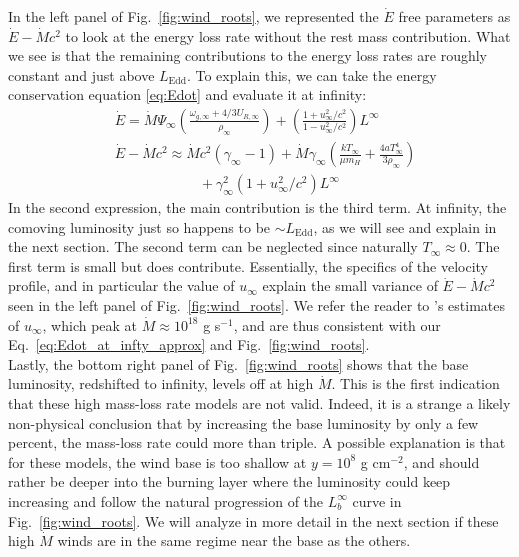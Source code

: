 \documentclass[../main.tex]{subfiles}
\newcommand{\Ledd}{L_\text{Edd}}
\newcommand{\Mdot}{\dot{M}}
\newcommand{\Edot}{\dot{E}}
\begin{document}
In the left panel of Fig.~\ref{fig:wind_roots}, we represented the $\Edot$ free parameters as $\Edot-\Mdot c^2$ to look at the energy loss rate without the rest mass contribution. What we see is that the remaining contributions to the energy loss rates are roughly constant and just above $\Ledd$. To explain this, we can take the energy conservation equation \eqref{eq:Edot} and evaluate it at infinity:
\begin{align}\label{eq:Edot_at_infty_approx}
    &\Edot=\Mdot\Psi_\infty \left(\frac{\omega_{g,\infty}+4/3U_{R,\infty}}{\rho_\infty}\right)+\left(\frac{1+u_\infty^2/c^2}{1-u_\infty^2/c^2}\right)L^\infty\nonumber\\
    &\Edot-\Mdot c^2\approx \Mdot c^2(\gamma_\infty-1) + \Mdot\gamma_\infty\left(\frac{kT_\infty}{\mu m_H}+\frac{4aT_\infty^4}{3\rho_\infty}\right)\nonumber\\
    &\qquad\qquad\qquad+\gamma_\infty^2(1+u_\infty^2/c^2)L^\infty
\end{align}
In the second expression, the main contribution is the third term. At infinity, the comoving luminosity just so happens to be $\sim\Ledd$, as we will see and explain in the next section. The second term can be neglected since naturally $T_\infty\approx 0$. The first term is small but does contribute. Essentially, the specifics of the velocity profile, and in particular the value of $u_\infty$ explain the small variance of $\Edot-\Mdot c
^2$ seen in the left panel of Fig.~\ref{fig:wind_roots}. We refer the reader to \citet{Paczynski1986b}'s estimates of $u_\infty$, which peak at $\Mdot\approx 10^{18}$ g s$^{-1}$, and are thus consistent with our Eq.~\eqref{eq:Edot_at_infty_approx} and Fig.~\ref{fig:wind_roots}.\\

Lastly, the bottom right panel of Fig.~\ref{fig:wind_roots} shows that the base luminosity, redshifted to infinity, levels off at high $\Mdot$. This is the first indication that these high mass-loss rate models are not valid. Indeed, it is a strange a likely non-physical conclusion that by increasing the base luminosity by only a few percent, the mass-loss rate could more than triple. A possible explanation is that for these models, the wind base is too shallow at $y=10^8$ g cm$^{-2}$, and should rather be deeper into the burning layer where the luminosity could keep increasing and follow the natural progression of the $L_b^\infty$ curve in Fig.~\ref{fig:wind_roots}. We will analyze in more detail in the next section if these high $\Mdot$ winds are in the same regime near the base as the others.
\end{document}
